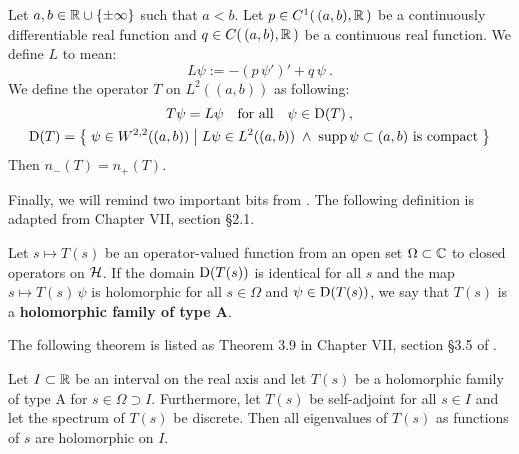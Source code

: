 \begin{thm}
    \label{thm-deficiency-diff-op}
    Let $a,b \in \mathbb{R} \cup \{ \pm\infty \}$ such that $a<b$. Let $p \in C^1( \, (a,b), \mathbb{R} \, )$ be a continuously differentiable real function and $q \in C( \, (a,b), \mathbb{R} \, )$ be a continuous real function. We define $L$ to mean:
    \begin{equation*}
        L \psi := -(p \, \psi')' + q \, \psi
        \: .
    \end{equation*}
    We define the operator $T$ on $L^2((a,b))$ as following:
    \begin{gather*}
        T \psi = L \psi
        \quad \text{for all} \quad
        \psi \in \mathrm{D}(T)
        \: ,
        \\
        \mathrm{D}(T) = \big\{\;
            \psi \in W^{2,2}((a,b))
            \;\big|\;
            L\psi \in L^2((a,b))
            \;\wedge\;
            \operatorname{supp} \psi \subset (a,b)
            \text{ is compact}
        \;\big\}
    \end{gather*}
    Then $n_-(T) = n_+(T)$.
\end{thm}

Finally, we will remind two important bits from \cite{Kato1995}. The following definition is adapted from Chapter VII, section §2.1.
\begin{defn}
    \label{defn-holo-type-A}
    Let $s \mapsto T(s)$ be an operator-valued function from an open set $\Omega \subset \mathbb{C}$ to closed operators on $\mathcal{H}$. If the domain $\mathrm{D}(T(s))$ is identical for all $s$ and the map $s \mapsto T(s) \, \psi$ is holomorphic for all $s \in \Omega$ and $\psi \in \mathrm{D}(T(s))$, we say that $T(s)$ is a \textbf{holomorphic family of type A}.
\end{defn}
The following theorem is listed as Theorem 3.9 in Chapter VII, section §3.5 of \cite{Kato1995}.
\begin{thm}
    \label{thm-eigenval-holo}
    Let $I\subset\mathbb{R}$ be an interval on the real axis and let $T(s)$ be a holomorphic family of type A for $s \in \Omega \supset I$. Furthermore, let $T(s)$ be self-adjoint for all $s \in I$ and let the spectrum of $T(s)$ be discrete. Then all eigenvalues of $T(s)$ as functions of $s$ are holomorphic on $I$.
\end{thm}



